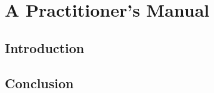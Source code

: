 \documentclass[12pt]{report}
\begin{document}
\chapter{A Practitioner's Manual}\label{chap:practitioner}

\section{Introduction}\label{sec:practitioner/introduction}

\section{Conclusion}
\end{document}
